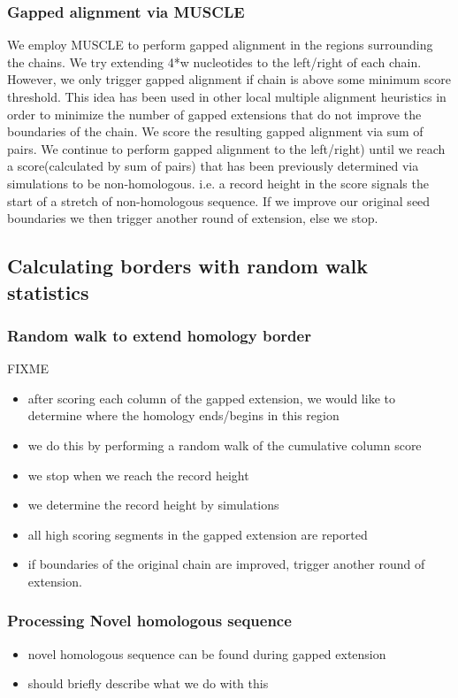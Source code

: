 \documentclass{llncs}
\begin{document}
\subsubsection{Gapped alignment via MUSCLE}
We employ MUSCLE to perform gapped alignment in the regions surrounding the chains. We try extending 4*w nucleotides to the left/right of each chain. However, we only trigger gapped alignment if chain is above some minimum score threshold. This idea has been used in other local multiple alignment heuristics in order to minimize the number of gapped extensions that do not improve the boundaries of the chain. We score the resulting gapped alignment via sum of pairs. We continue to perform gapped alignment to the left/right) until we reach a score(calculated by sum of pairs) that has been previously determined via simulations to be non-homologous. i.e. a record height in the score signals the start of a stretch of non-homologous sequence.  If we improve our original seed boundaries we then trigger another round of extension, else we stop. 

\subsection{Calculating borders with random walk statistics}

\subsubsection{Random walk to extend homology border}
FIXME
\begin{itemize}
\item after scoring each column of the gapped extension, we would like
to determine where the homology ends/begins in this region
\item we do this by performing a random walk of the cumulative column score
\item we stop when we reach the record height
\item we determine the record height by simulations
\item all high scoring segments in the gapped extension are reported
\item if boundaries of the original chain are improved, trigger another round of extension.
\end{itemize}

\subsubsection{Processing Novel homologous sequence}
\begin{itemize}
\item novel homologous sequence can be found during gapped extension
\item should briefly describe what we do with this
\end{itemize}
\end{document}
